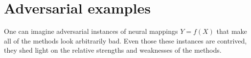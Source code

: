 \documentclass{article}
\newtheorem{theorem}{Theorem}
\newtheorem{problem}{Problem}
\DeclareMathOperator{\expect}{\mathbb{E}}
\begin{document}



\section{Adversarial examples}
\label{sec:adversariality}
One can imagine adversarial instances of neural mappings \(Y=f(X)\) that make all of the methods look arbitrarily bad.
Even those these instances are contrived, they shed light on the relative strengths and weaknesses of the methods.
\end{document}
